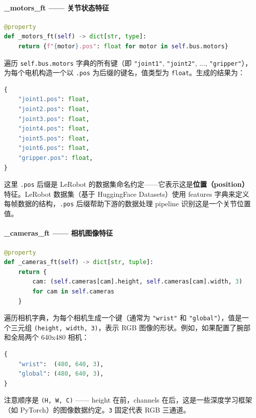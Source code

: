 \documentclass[UTF8,a4paper,11pt]{ctexart}
\begin{document}
{\paragraph{_motors_ft —— 关节状态特征}


\begin{lstlisting}[language=python]
@property
def _motors_ft(self) -> dict[str, type]:
    return {f"{motor}.pos": float for motor in self.bus.motors}
\end{lstlisting}

遍历 \texttt{self.bus.motors} 字典的所有键（即 \texttt{"joint1"}, \texttt{"joint2"}, ..., \texttt{"gripper"}），为每个电机构造一个以 \texttt{.pos} 为后缀的键名，值类型为 \texttt{float}。生成的结果为：

\begin{lstlisting}[language=python]
{
    "joint1.pos": float,
    "joint2.pos": float,
    "joint3.pos": float,
    "joint4.pos": float,
    "joint5.pos": float,
    "joint6.pos": float,
    "gripper.pos": float,
}
\end{lstlisting}

这里 \texttt{.pos} 后缀是 LeRobot 的数据集命名约定——它表示这是\textbf{位置（position）}特征。LeRobot 数据集（基于 HuggingFace Datasets）使用 features 字典来定义每帧数据的结构，\texttt{.pos} 后缀帮助下游的数据处理 pipeline 识别这是一个关节位置值。

\paragraph{_cameras_ft —— 相机图像特征}


\begin{lstlisting}[language=python]
@property
def _cameras_ft(self) -> dict[str, tuple]:
    return {
        cam: (self.cameras[cam].height, self.cameras[cam].width, 3)
        for cam in self.cameras
    }
\end{lstlisting}

遍历相机字典，为每个相机生成一个键（通常为 \texttt{"wrist"} 和 \texttt{"global"}），值是一个三元组 \texttt{(height, width, 3)}，表示 RGB 图像的形状。例如，如果配置了腕部和全局两个 640x480 相机：

\begin{lstlisting}[language=python]
{
    "wrist":  (480, 640, 3),
    "global": (480, 640, 3),
}
\end{lstlisting}

注意顺序是 \texttt{(H, W, C)} —— height 在前，channels 在后，这是一些深度学习框架（如 PyTorch）的图像数据约定。\texttt{3} 固定代表 RGB 三通道。

}
\end{document}
